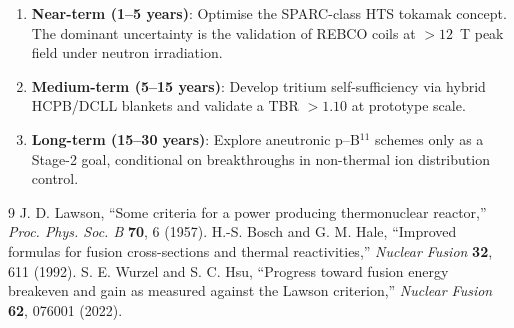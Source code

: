 \documentclass[11pt]{article}
\begin{document}
\begin{enumerate}
\item \textbf{Near-term (1--5 years)}: Optimise the SPARC-class HTS tokamak
concept. The dominant uncertainty is the validation of REBCO coils at
$> 12$~T peak field under neutron irradiation.
\item \textbf{Medium-term (5--15 years)}: Develop tritium self-sufficiency
via hybrid HCPB/DCLL blankets and validate a TBR $> 1.10$ at prototype scale.
\item \textbf{Long-term (15--30 years)}: Explore aneutronic p--B$^{11}$
schemes only as a Stage-2 goal, conditional on breakthroughs in non-thermal
ion distribution control.
\end{enumerate}

\begin{thebibliography}{9}
 J. D. Lawson, ``Some criteria for a power producing
thermonuclear reactor,'' \textit{Proc. Phys. Soc. B} \textbf{70}, 6 (1957).
 H.-S. Bosch and G. M. Hale, ``Improved formulas for
fusion cross-sections and thermal reactivities,'' \textit{Nuclear Fusion}
\textbf{32}, 611 (1992).
 S. E. Wurzel and S. C. Hsu, ``Progress toward fusion
energy breakeven and gain as measured against the Lawson criterion,''
\textit{Nuclear Fusion} \textbf{62}, 076001 (2022).
\end{thebibliography}
\end{document}
